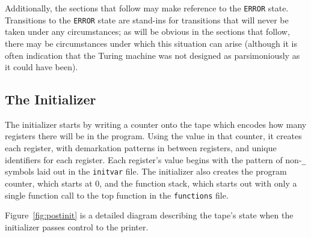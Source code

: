 \documentclass[11pt]{article}
\begin{document}
Additionally, the sections that follow may make reference to the \texttt{ERROR} state. Transitions to the \texttt{ERROR} state are stand-ins for transitions that will never be taken under any circumstances; as will be obvious in the sections that follow, there may be circumstances under which this situation can arise (although it is often indication that the Turing machine was not designed as parsimoniously as it could have been).

\subsection{The Initializer}

The initializer starts by writing a counter onto the tape which encodes how many registers there will be in the program. Using the value in that counter, it creates each register, with demarkation patterns in between registers, and unique identifiers for each register. Each register's value begins with the pattern of non-\texttt{\_} symbols laid out in the \texttt{initvar} file. The initializer also creates the program counter, which starts at 0, and the function stack, which starts out with only a single function call to the top function in the \texttt{functions} file.

Figure~\ref{fig:postinit} is a detailed diagram describing the tape's state when the initializer passes control to the printer. 
\end{document}
